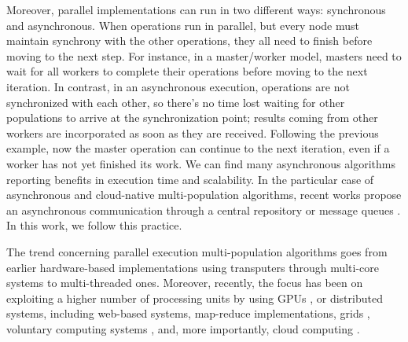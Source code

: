 \documentclass[review]{elsarticle}
\begin{document}
Moreover, parallel implementations can run in two different ways: synchronous and
asynchronous. When operations run in parallel, but every node must maintain synchrony with
the other operations, they all need to finish before moving to the next
step. For instance, in a  master/worker model, masters need to wait for all
workers to complete their operations before moving to the next iteration.  In
contrast, in an asynchronous execution,  operations are not synchronized with
each other, so there's no time lost waiting for other populations to
arrive at the synchronization point; results coming from other workers are 
incorporated as soon as they are received. Following the previous example, now the master operation can
continue to the next iteration, even if a worker has not yet finished its work. 
We can find many asynchronous algorithms
\cite{coleman89,baugh2003asynchronous} reporting benefits in execution time
and scalability. In the particular case of asynchronous and cloud-native
multi-population algorithms, recent works propose an asynchronous communication
through a central repository \cite{sofea:cec2012, JSON} or message queues
\cite{salza2019speed, guervos2018introducing}. In this work, we follow this
practice.

The trend concerning parallel execution multi-population algorithms goes from
earlier hardware-based implementations using transputers
\cite{gorges1990explicit} through 
multi-core systems \cite{Serrano2008,lai2019adaptive} to multi-threaded \cite{merelo2019scaling} ones.
Moreover, recently, the focus has been on exploiting a higher number of processing
units by using GPUs \cite{tan2015survey,li2007efficient}, or distributed
systems, including web-based \cite{JSON} systems,
map-reduce \cite{fazenda2012} implementations,  grids \cite{munawar2010design,Gonzalez09},
voluntary computing systems \cite{MilkyWay,merelo2016nodio}, 
and, more importantly, cloud computing
\cite{GValdez2015,salza2019speed,valenzuela2015implementing,FlexGP}.
\end{document}
